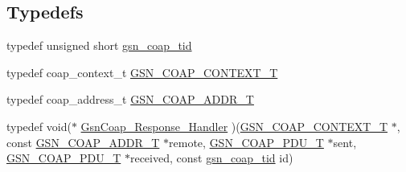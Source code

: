 \subsection*{Typedefs}
\begin{DoxyCompactItemize}
\item 
typedef unsigned short \hyperlink{a00479_adc7d7e60daa14476026edb6edc26b0d6}{gsn\_\-coap\_\-tid}
\item 
typedef coap\_\-context\_\-t \hyperlink{a00479_ab529666f5a53e57a0760df584886eb5b}{GSN\_\-COAP\_\-CONTEXT\_\-T}
\item 
typedef coap\_\-address\_\-t \hyperlink{a00479_a5fe762c7fbc5387bb76de5d8adfc1bc4}{GSN\_\-COAP\_\-ADDR\_\-T}
\item 
typedef void($\ast$ \hyperlink{a00479_ab7f36da79cbe8ef013039d64a86a29ae}{GsnCoap\_\-Response\_\-Handler} )(\hyperlink{a00479_ab529666f5a53e57a0760df584886eb5b}{GSN\_\-COAP\_\-CONTEXT\_\-T} $\ast$, const \hyperlink{a00479_a5fe762c7fbc5387bb76de5d8adfc1bc4}{GSN\_\-COAP\_\-ADDR\_\-T} $\ast$remote, \hyperlink{a00538_afde87a99bfaad4a8beac3df27a309976}{GSN\_\-COAP\_\-PDU\_\-T} $\ast$sent, \hyperlink{a00538_afde87a99bfaad4a8beac3df27a309976}{GSN\_\-COAP\_\-PDU\_\-T} $\ast$received, const \hyperlink{a00479_adc7d7e60daa14476026edb6edc26b0d6}{gsn\_\-coap\_\-tid} id)
\end{DoxyCompactItemize}
